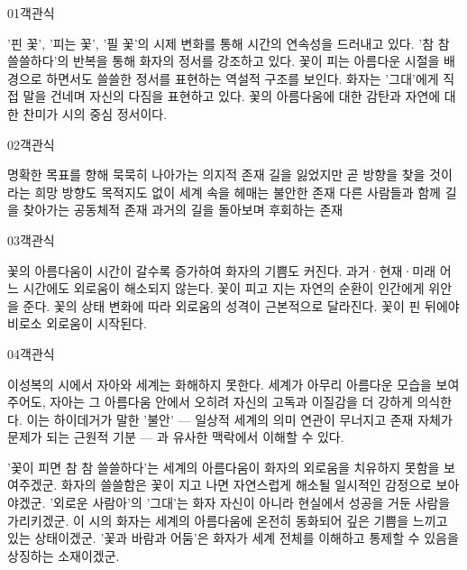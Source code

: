\documentclass[fs85,seriesWit]{korfarm-base}
\begin{document}
\kfBeginMC
\begin{kfQBlock}{01}{객관식}
\begin{kfChoices}
\kfChoice '핀 꽃', '피는 꽃', '필 꽃'의 시제 변화를 통해 시간의 연속성을 드러내고 있다.
\kfChoice '참 참 쓸쓸하다'의 반복을 통해 화자의 정서를 강조하고 있다.
\kfChoice 꽃이 피는 아름다운 시절을 배경으로 하면서도 쓸쓸한 정서를 표현하는 역설적 구조를 보인다.
\kfChoice 화자는 '그대'에게 직접 말을 건네며 자신의 다짐을 표현하고 있다.
\kfChoice 꽃의 아름다움에 대한 감탄과 자연에 대한 찬미가 시의 중심 정서이다.
\end{kfChoices}
\end{kfQBlock}

\begin{kfQBlock}{02}{객관식}
\begin{kfChoices}
\kfChoice 명확한 목표를 향해 묵묵히 나아가는 의지적 존재
\kfChoice 길을 잃었지만 곧 방향을 찾을 것이라는 희망
\kfChoice 방향도 목적지도 없이 세계 속을 헤매는 불안한 존재
\kfChoice 다른 사람들과 함께 길을 찾아가는 공동체적 존재
\kfChoice 과거의 길을 돌아보며 후회하는 존재
\end{kfChoices}
\end{kfQBlock}

\begin{kfQBlock}{03}{객관식}
\begin{kfChoices}
\kfChoice 꽃의 아름다움이 시간이 갈수록 증가하여 화자의 기쁨도 커진다.
\kfChoice 과거·현재·미래 어느 시간에도 외로움이 해소되지 않는다.
\kfChoice 꽃이 피고 지는 자연의 순환이 인간에게 위안을 준다.
\kfChoice 꽃의 상태 변화에 따라 외로움의 성격이 근본적으로 달라진다.
\kfChoice 꽃이 핀 뒤에야 비로소 외로움이 시작된다.
\end{kfChoices}
\end{kfQBlock}

\begin{kfQBlock}{04}{객관식}
\begin{kfEvidence}이성복의 시에서 자아와 세계는 화해하지 못한다. 세계가 아무리 아름다운 모습을 보여주어도, 자아는 그 아름다움 안에서 오히려 자신의 고독과 이질감을 더 강하게 의식한다. 이는 하이데거가 말한 '불안' — 일상적 세계의 의미 연관이 무너지고 존재 자체가 문제가 되는 근원적 기분 — 과 유사한 맥락에서 이해할 수 있다.\end{kfEvidence}
\begin{kfChoices}
\kfChoice '꽃이 피면 참 참 쓸쓸하다'는 세계의 아름다움이 화자의 외로움을 치유하지 못함을 보여주겠군.
\kfChoice 화자의 쓸쓸함은 꽃이 지고 나면 자연스럽게 해소될 일시적인 감정으로 보아야겠군.
\kfChoice '외로운 사람아'의 '그대'는 화자 자신이 아니라 현실에서 성공을 거둔 사람을 가리키겠군.
\kfChoice 이 시의 화자는 세계의 아름다움에 온전히 동화되어 깊은 기쁨을 느끼고 있는 상태이겠군.
\kfChoice '꽃과 바람과 어둠'은 화자가 세계 전체를 이해하고 통제할 수 있음을 상징하는 소재이겠군.
\end{kfChoices}
\end{kfQBlock}
\end{document}
